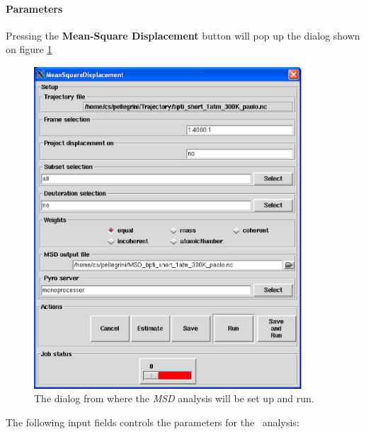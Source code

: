 \documentclass[a4paper,11pt]{report}
\begin{document}
\paragraph{Parameters\\}
\label{msd_parameters}
Pressing the \textbf{Mean-Square Displacement} button will pop up the dialog shown on figure \ref{fig:msd}
\begin{figure}[h!]
\begin{center}
\includegraphics[width=10cm]{Figures/msd.eps}
\end{center}
\caption[The \textit{MSD} analysis dialog]{The dialog from where the \textit{MSD} analysis will be set up and run.}
\label{fig:msd}
\end{figure}   

The following input fields controls the parameters for the \MSD\ analysis:
\end{document}
